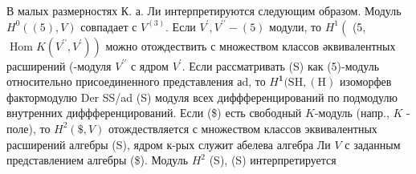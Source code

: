 \documentclass[10pt]{article}
\begin{document}
В малых размерностях К. а. Ли интерпретируются следующим образом. Модуль $H^{0}((5), V)$ совпадает с $V^{(3)}$. Если $V^{\prime}, V^{\prime \prime}-(5)$ модули, то $H^{1}\left(\right.$ (5, $\left.\operatorname{Hom} K\left(V^{\prime \prime}, V^{\prime}\right)\right)$ можно отождествить с множеством классов әквивалентных расширений (-модуля $V^{\prime \prime}$ с ядром $V^{\prime}$. Если рассматривать (S) как (5)-модуль относительно присоединенного представления аd, то $H^{\mathbf{1}}(\mathrm{SH},(\mathrm{H})$ изоморфев фактормодулю Der SS/ad (S) модуля всех диффференцирований по подмодулю внутренних диффференцирований. Если (\$) есть свободный $K$-модуль (напр., $K$ - поле), то $H^{2}(\$, V)$ отождествляется с множеством классов эквивалентных расширений алгебры (S), ядром к-рых служит абелева алгебра Ли $V$ с заданным представлением алгебры (\$). Модуль $H^{2}$ (S), (S) интерпретируется
\end{document}

